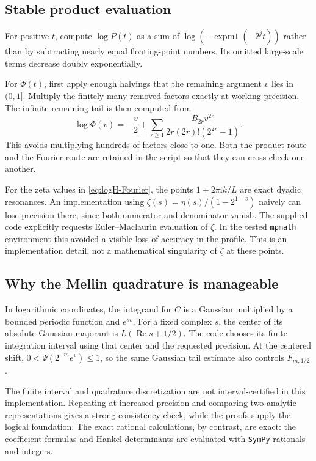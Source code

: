 \documentclass[11pt,a4paper]{article}
\numberwithin{equation}{section}
\theoremstyle{definition}
\theoremstyle{remark}
\newcommand{\ii}{\mathrm i}
\newcommand{\Rea}{\operatorname{Re}}
\begin{document}
\subsection{Stable product evaluation}
For positive $t$, compute $\log P(t)$ as a sum of
$\log(-\operatorname{expm1}(-2^jt))$ rather than by subtracting nearly
equal floating-point numbers. Its omitted large-scale terms decrease
doubly exponentially.

For $\Phi(t)$, first apply enough halvings that the remaining argument
$v$ lies in $(0,1]$. Multiply the finitely many removed factors
exactly at working precision. The infinite remaining tail is then
computed from
\begin{equation}
 \log\Phi(v)=-\frac v2+
 \sum_{r\ge1}\frac{B_{2r}v^{2r}}{2r(2r)!(2^{2r}-1)}.
 \label{eq:Phi-numeric}
\end{equation}
This avoids multiplying hundreds of factors close to one. Both the
product route and the Fourier route are retained in the script so
that they can cross-check one another.

For the zeta values in \cref{eq:logH-Fourier}, the points
$1+2\pi\ii k/L$ are exact dyadic resonances. An implementation using
$\zeta(s)=\eta(s)/(1-2^{1-s})$ naively can lose precision there,
since both numerator and denominator vanish. The supplied code
explicitly requests Euler--Maclaurin evaluation of $\zeta$.
In the tested \texttt{mpmath} environment this avoided a visible
loss of accuracy in the profile. This is an implementation detail,
not a mathematical singularity of $\zeta$ at these points.

\subsection{Why the Mellin quadrature is manageable}
In logarithmic coordinates, the integrand for $C$ is a Gaussian
multiplied by a bounded periodic function and $e^{sv}$.
For a fixed complex $s$, the center of its absolute Gaussian
majorant is $L(\Rea s+1/2)$. The code chooses its finite integration
interval using that center and the requested precision.
At the centered shift, $0<\Psi(2^{-m}e^v)\le1$, so the same
Gaussian tail estimate also controls $F_{m,1/2}$.

The finite interval and quadrature discretization are not
interval-certified in this implementation. Repeating at increased
precision and comparing two analytic representations gives a strong
consistency check, while the proofs supply the logical foundation.
The exact rational calculations, by contrast, are exact: the
coefficient formulas and Hankel determinants are evaluated with
\texttt{SymPy} rationals and integers.
\end{document}
